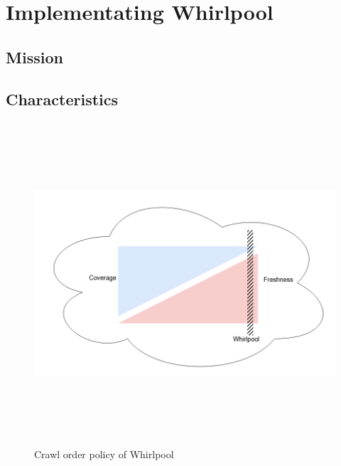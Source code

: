 \chapter{Implementating Whirlpool}\label{implwhirlpool}
\section{Mission}
\section{Characteristics}
\begin{figure}[h!]
  \centering
  \includegraphics[width=15cm,height=12cm,keepaspectratio]{../media/crawler/whirlpool-crawl-order.png}
  \caption{Crawl order policy of Whirlpool}
  \label{fig:whrlplcrawlorder}
\end{figure}

\pagebreak